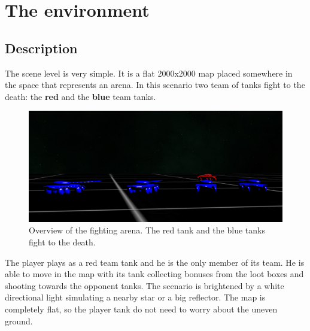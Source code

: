 \documentclass[14pt]{article}
\begin{document}
\section{The environment}
\subsection{Description}
The scene level is very simple. It is a flat 2000x2000 map placed somewhere in the space that represents an arena. In this scenario two team of tanks fight to the death: the \textbf{red} and the \textbf{blue} team tanks. \\
\begin{figure}[H]
\includegraphics[width = 12cm]{images/scenario3.png}
\caption{Overview of the fighting arena. The red tank and the blue tanks fight to the death.}
\label{img:scenario}
\end{figure}



The player plays as a red team tank and he is the only member of its team. He is able to move in the map with its tank collecting bonuses from the loot boxes and shooting towards the opponent tanks. The scenario is brightened by a white directional light  simulating a nearby star or a big reflector. The map is completely flat, so the player tank do not need to worry about the uneven ground.\\
\end{document}
